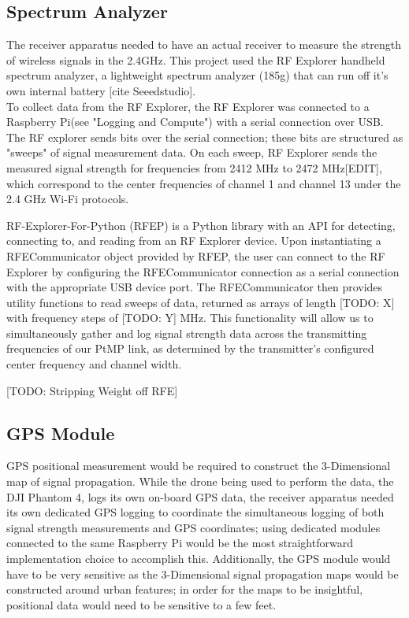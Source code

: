 \documentclass[pageno]{jpaper}
\begin{document}
\subsection{Spectrum Analyzer}
The receiver apparatus needed to have an actual receiver to measure the strength of wireless signals in the 2.4GHz. This project used the RF Explorer handheld spectrum analyzer, a lightweight spectrum analyzer (185g) that can run off it's own internal battery [cite Seeedstudio].\\
To collect data from the RF Explorer, the RF Explorer was connected to a Raspberry Pi(see "Logging and Compute") with a serial connection over USB. The RF explorer sends bits over the serial connection; these bits are structured as "sweeps" of signal measurement data. On each sweep, RF Explorer sends the measured signal strength for frequencies from 2412 MHz to 2472 MHz[EDIT], which correspond to the center frequencies of channel 1 and channel 13 under the 2.4 GHz Wi-Fi protocols.

RF-Explorer-For-Python (RFEP) is a Python library with an API for detecting, connecting to, and reading from an RF Explorer device. Upon instantiating a RFECommunicator object provided by RFEP, the user can connect to the RF Explorer by configuring the RFECommunicator connection as a serial connection with the appropriate USB device port. The RFECommunicator then provides utility functions to read sweeps of data, returned as arrays of length [TODO: X] with frequency steps of [TODO: Y] MHz. This functionality will allow us to simultaneously gather and log signal strength data across the transmitting frequencies of our PtMP link, as determined by the transmitter's configured center frequency and channel width.

[TODO: Stripping Weight off RFE]

\subsection{GPS Module}
GPS positional measurement would be required to construct the 3-Dimensional map of signal propagation. While the drone being used to perform the data, the DJI Phantom 4, logs its own on-board GPS data, the receiver apparatus needed its own dedicated GPS logging to coordinate the simultaneous logging of both signal strength measurements and GPS coordinates; using dedicated modules connected to the same Raspberry Pi would be the most straightforward implementation choice to accomplish this. Additionally, the GPS module would have to be very sensitive as the 3-Dimensional signal propagation maps would be constructed around urban features; in order for the maps to be insightful, positional data would need to be sensitive to a few feet.
\end{document}
